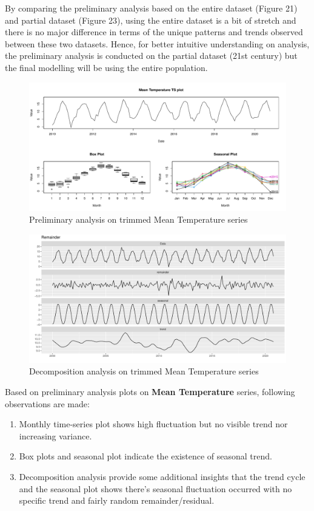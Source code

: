 \documentclass[
  11pt,
]{article}
\providecommand{\tightlist}{%
  \setlength{\itemsep}{0pt}\setlength{\parskip}{0pt}}
\begin{document}
By comparing the preliminary analysis based on the entire dataset
(Figure 21) and partial dataset (Figure 23), using the entire dataset is
a bit of stretch and there is no major difference in terms of the unique
patterns and trends observed between these two datasets. Hence, for
better intuitive understanding on analysis, the preliminary analysis is
conducted on the partial dataset (21st century) but the final modelling
will be using the entire population.

\newpage

\begin{figure}
\centering
\includegraphics{ST422_files/figure-latex/unnamed-chunk-31-1.pdf}
\caption{Preliminary analysis on trimmed Mean Temperature series}
\end{figure}

\begin{figure}
\centering
\includegraphics{ST422_files/figure-latex/unnamed-chunk-32-1.pdf}
\caption{Decomposition analysis on trimmed Mean Temperature series}
\end{figure}

Based on preliminary analysis plots on \textbf{Mean Temperature} series,
following observations are made:

\begin{enumerate}
\def\labelenumi{\arabic{enumi}.}
\tightlist
\item
  Monthly time-series plot shows high fluctuation but no visible trend
  nor increasing variance.
\item
  Box plots and seasonal plot indicate the existence of seasonal trend.
\item
  Decomposition analysis provide some additional insights that the trend
  cycle and the seasonal plot shows there's seasonal fluctuation
  occurred with no specific trend and fairly random remainder/residual.
\end{enumerate}
\end{document}
